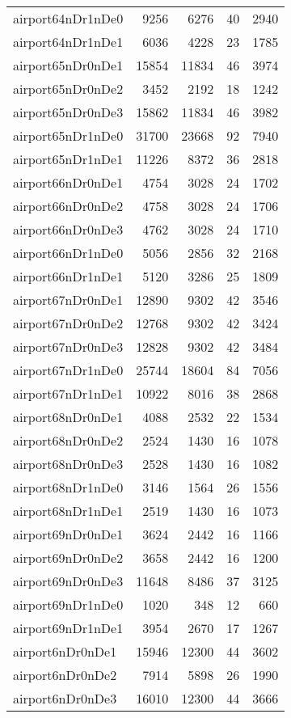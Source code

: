 \begin{tabular}{lrrrr}
airport64nDr1nDe0 & 9256 & 6276 & 40 & 2940 \\
airport64nDr1nDe1 & 6036 & 4228 & 23 & 1785 \\
airport65nDr0nDe1 & 15854 & 11834 & 46 & 3974 \\
airport65nDr0nDe2 & 3452 & 2192 & 18 & 1242 \\
airport65nDr0nDe3 & 15862 & 11834 & 46 & 3982 \\
airport65nDr1nDe0 & 31700 & 23668 & 92 & 7940 \\
airport65nDr1nDe1 & 11226 & 8372 & 36 & 2818 \\
airport66nDr0nDe1 & 4754 & 3028 & 24 & 1702 \\
airport66nDr0nDe2 & 4758 & 3028 & 24 & 1706 \\
airport66nDr0nDe3 & 4762 & 3028 & 24 & 1710 \\
airport66nDr1nDe0 & 5056 & 2856 & 32 & 2168 \\
airport66nDr1nDe1 & 5120 & 3286 & 25 & 1809 \\
airport67nDr0nDe1 & 12890 & 9302 & 42 & 3546 \\
airport67nDr0nDe2 & 12768 & 9302 & 42 & 3424 \\
airport67nDr0nDe3 & 12828 & 9302 & 42 & 3484 \\
airport67nDr1nDe0 & 25744 & 18604 & 84 & 7056 \\
airport67nDr1nDe1 & 10922 & 8016 & 38 & 2868 \\
airport68nDr0nDe1 & 4088 & 2532 & 22 & 1534 \\
airport68nDr0nDe2 & 2524 & 1430 & 16 & 1078 \\
airport68nDr0nDe3 & 2528 & 1430 & 16 & 1082 \\
airport68nDr1nDe0 & 3146 & 1564 & 26 & 1556 \\
airport68nDr1nDe1 & 2519 & 1430 & 16 & 1073 \\
airport69nDr0nDe1 & 3624 & 2442 & 16 & 1166 \\
airport69nDr0nDe2 & 3658 & 2442 & 16 & 1200 \\
airport69nDr0nDe3 & 11648 & 8486 & 37 & 3125 \\
airport69nDr1nDe0 & 1020 & 348 & 12 & 660 \\
airport69nDr1nDe1 & 3954 & 2670 & 17 & 1267 \\
airport6nDr0nDe1 & 15946 & 12300 & 44 & 3602 \\
airport6nDr0nDe2 & 7914 & 5898 & 26 & 1990 \\
airport6nDr0nDe3 & 16010 & 12300 & 44 & 3666 \\

\end{tabular}

